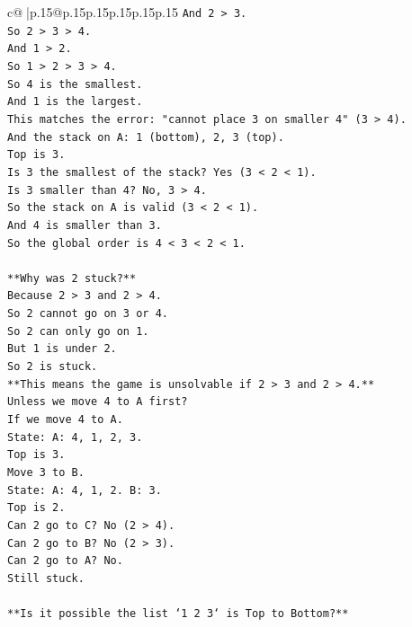\documentclass{article}
\begin{document}
{\begin{supertabular}{c@{$\;$}|p{.15\linewidth}@{}p{.15\linewidth}p{.15\linewidth}p{.15\linewidth}p{.15\linewidth}p{.15\linewidth}}
{{{\texttt{And 2 > 3.} \\
\texttt{So 2 > 3 > 4.} \\
\texttt{And 1 > 2.} \\
\texttt{So 1 > 2 > 3 > 4.} \\
\texttt{So 4 is the smallest.} \\
\texttt{And 1 is the largest.} \\
\texttt{This matches the error: "cannot place 3 on smaller 4" (3 > 4).} \\
\texttt{And the stack on A: 1 (bottom), 2, 3 (top).} \\
\texttt{Top is 3.} \\
\texttt{Is 3 the smallest of the stack? Yes (3 < 2 < 1).} \\
\texttt{Is 3 smaller than 4? No, 3 > 4.} \\
\texttt{So the stack on A is valid (3 < 2 < 1).} \\
\texttt{And 4 is smaller than 3.} \\
\texttt{So the global order is 4 < 3 < 2 < 1.} \\
\\ 
\texttt{**Why was 2 stuck?**} \\
\texttt{Because 2 > 3 and 2 > 4.} \\
\texttt{So 2 cannot go on 3 or 4.} \\
\texttt{So 2 can only go on 1.} \\
\texttt{But 1 is under 2.} \\
\texttt{So 2 is stuck.} \\
\texttt{**This means the game is unsolvable if 2 > 3 and 2 > 4.**} \\
\texttt{Unless we move 4 to A first?} \\
\texttt{If we move 4 to A.} \\
\texttt{State: A: 4, 1, 2, 3.} \\
\texttt{Top is 3.} \\
\texttt{Move 3 to B.} \\
\texttt{State: A: 4, 1, 2. B: 3.} \\
\texttt{Top is 2.} \\
\texttt{Can 2 go to C? No (2 > 4).} \\
\texttt{Can 2 go to B? No (2 > 3).} \\
\texttt{Can 2 go to A? No.} \\
\texttt{Still stuck.} \\
\\ 
\texttt{**Is it possible the list `1 2 3` is Top to Bottom?**} \\
}}}
\end{supertabular}}
\end{document}
